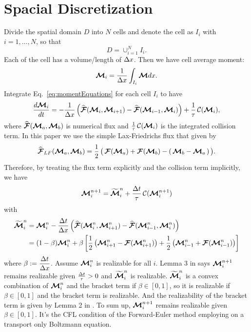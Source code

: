 \section{Spacial Discretization}\label{se:SpacialDiscretization}

Divide the spatial domain $D$ into $N$ cells and denote the cell as $I_{i}$ with $i = 1,\ldots,N$, so that
\begin{equation*}
D = \cup_{i = 1}^{N} I_{i}.
\end{equation*}
Each of the cell has a volume/length of $\Delta x$.
Then we have cell average moment:
\begin{equation}
\boldsymbol{\mathcal{M}}_{i} = \dfrac{1}{\Delta x} \int_{I_i}\boldsymbol{\mathcal{M}} dx.
\end{equation}
Integrate Eq.~\eqref{eq:momentEquations} for each cell $I_{i}$ to have
\begin{equation}
\dfrac{d \boldsymbol{\mathcal{M}}_{i}}{d t} = - \dfrac{1}{\Delta x} \left( \widehat{\boldsymbol{\mathcal{F}}}(\boldsymbol{\mathcal{M}}_{i},\boldsymbol{\mathcal{M}}_{i+1}) -  \widehat{\boldsymbol{\mathcal{F}}}(\boldsymbol{\mathcal{M}}_{i-1},\boldsymbol{\mathcal{M}}_{i})\right) + \frac{1}{\tau}\,\mathcal{C}(\boldsymbol{\mathcal{M}}_{i}),
\end{equation}
where $\widehat{\boldsymbol{\mathcal{F}}}(\boldsymbol{\mathcal{M}}_{a},\boldsymbol{\mathcal{M}}_{b})$ is numerical flux and $\frac{1}{\tau}\,\mathcal{C}(\boldsymbol{\mathcal{M}}_{i})$ is the integrated collision term.
In this paper we use the simple Lax-Friedrichs flux that given by
\begin{equation}
  \widehat{\boldsymbol{\mathcal{F}}}_{LF}(\boldsymbol{\mathcal{M}}_{a},\boldsymbol{\mathcal{M}}_{b})
  =\frac{1}{2}\,\big(\,\boldsymbol{\mathcal{F}}(\boldsymbol{\mathcal{M}}_{a})+\boldsymbol{\mathcal{F}}(\boldsymbol{\mathcal{M}}_{b})-(\,\boldsymbol{\mathcal{M}}_{b}-\boldsymbol{\mathcal{M}}_{a}\,)\,\big).
\end{equation}
Therefore, by treating the flux term explicitly and the collision term implicitly, we have
\begin{align*}
\boldsymbol{\mathcal{M}}_{i}^{n+1} = \widetilde{\boldsymbol{\mathcal{M}}}^{n}_{i} + \frac{\Delta t}{\tau}\,\mathcal{C}(\boldsymbol{\mathcal{M}}^{n+1}_{i})
\end{align*}
with
\begin{align*}
\widetilde{\boldsymbol{\mathcal{M}}}^{n}_{i} 
& = \boldsymbol{\mathcal{M}}_{i}^{n} - \dfrac{\Delta t}{\Delta x} \left( \widehat{\boldsymbol{\mathcal{F}}}(\boldsymbol{\mathcal{M}}^{n}_{i},\boldsymbol{\mathcal{M}}^{n}_{i+1}) -  \widehat{\boldsymbol{\mathcal{F}}}(\boldsymbol{\mathcal{M}}^{n}_{i-1},\boldsymbol{\mathcal{M}}^{n}_{i})\right)\nonumber \\
& = (1-\beta)\boldsymbol{\mathcal{M}}_{i}^{n} + \beta\left[ \frac{1}{2}\left( \boldsymbol{\mathcal{M}}^{n}_{i+1}-\boldsymbol{\mathcal{F}}(\boldsymbol{\mathcal{M}}^{n}_{i+1})\right)  + \frac{1}{2}\left( \boldsymbol{\mathcal{M}}^{n}_{i-1}+\boldsymbol{\mathcal{F}}(\boldsymbol{\mathcal{M}}^{n}_{i-1})\right)\right]
\end{align*}
where $\beta := \dfrac{\Delta t}{\Delta x}$.
Assume $\boldsymbol{\mathcal{M}}_{i}^{n}$ is realizable for all $i$. 
Lemma 3 in \cite{chu_2018} says $\boldsymbol{\mathcal{M}}^{n+1}_{i}$ remains realizable given $\frac{\Delta t}{\tau} > 0$ and $\widetilde{\boldsymbol{\mathcal{M}}}^{n}_{i}$ is realizable.
$\widetilde{\boldsymbol{\mathcal{M}}}^{n}_{i}$ is a convex combination of $\boldsymbol{\mathcal{M}}_{i}^{n}$ and the bracket term if $\beta \in [0,1]$, so it is realizable if $\beta \in [0,1]$ and the bracket term is realizable.
And the realizability of the bracket term is given by Lemma 2 in \cite{chu_2018}.
To sum up, $\boldsymbol{\mathcal{M}}^{n+1}_{i}$ remains realizable given $\beta \in [0,1]$.
It's the CFL condition of the Forward-Euler method employing on a transport only Boltzmann equation.
